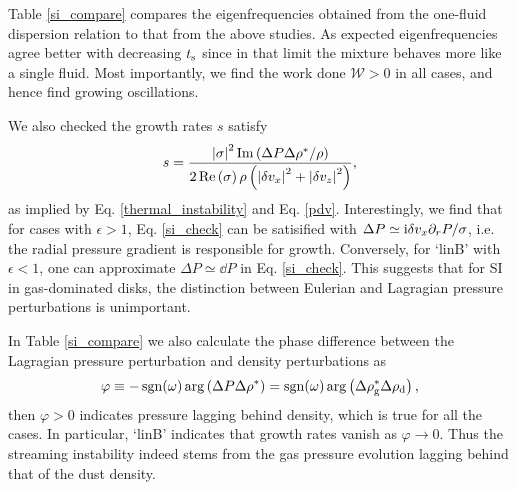 Table \ref{si_compare} compares the eigenfrequencies obtained from the
one-fluid dispersion relation to that from the above studies. As  
expected eigenfrequencies agree better with decreasing $t_\mathrm{s}$ since
in that limit the mixture behaves more like a single fluid. Most 
importantly, we find the work done $\mathcal{W}>0$ in all cases, and
hence find growing oscillations. 


We also checked the growth rates $s$ satisfy 
\begin{align} 
  s = \frac{\left|\sigma\right|^2\operatorname{Im}\left(\Delta P
    \Delta\rho^*/\rho\right)}{2\operatorname{Re}\left(\sigma\right)\rho\left(\left|\delta
  v_x\right|^2+\left|\delta
  v_z\right|^2\right)}, \label{si_check}
\end{align}
as implied by Eq. \ref{thermal_instability} and
Eq. \ref{pdv}. %
Interestingly, we find that for cases with
$\epsilon>1$, Eq. \ref{si_check} can be satisified with $\Delta
P\simeq \mathrm{i}\delta v_x \partial_rP/\sigma$, i.e. the radial pressure gradient
is responsible for growth. Conversely, for `linB' with $\epsilon
< 1$, one can approximate $\Delta P \simeq \dd P$ in Eq. \ref{si_check}. This
suggests that for SI in gas-dominated disks, the distinction between
Eulerian and Lagragian pressure perturbations is unimportant. 

In Table \ref{si_compare} we also calculate the phase difference
between the Lagragian pressure perturbation and density perturbations
as    
\begin{align*} 
\varphi \equiv -\operatorname{sgn}(\omega)\arg\left(\Delta P\Delta\rho^*\right)
        = \operatorname{sgn}(\omega)\arg\left(\Delta\rho_\mathrm{g}^*\Delta\rho_\mathrm{d}\right),\notag
\end{align*}
then $\varphi > 0 $ indicates pressure lagging behind density, which
is true for all the cases. In particular, `linB' indicates that growth
rates vanish as $\varphi \to 0$.  
Thus the streaming instability indeed stems  
from the gas pressure evolution lagging behind that of the dust 
density. 




